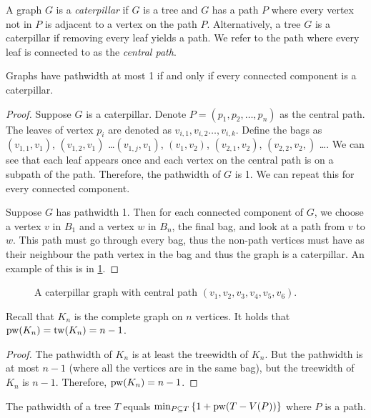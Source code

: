 A graph \(G\) is a \textit{caterpillar} if \(G\) is a tree and $G$ has a path \(P\) where every vertex not in $P$ is adjacent to a vertex on the path \(P\). Alternatively, a tree \(G\) is a caterpillar if removing every leaf yields a path. We refer to the path where every leaf is connected to as the \textit{central path}.
\begin{theorem}
	Graphs have pathwidth at most 1 if and only if every connected component is a caterpillar.
\end{theorem}
\begin{proof}
	Suppose \(G\) is a caterpillar.
	Denote \(P =\left( p_1, p_2, \dots, p_n\right)\) as the central path. The leaves of vertex \(p_i\) are denoted as \(v_{i, 1}, v_{i, 2} \dots, v_{i, k}\). Define the bags as \((v_{1, 1}, v_1)\), \((v_{1, 2}, v_1)\) \dots \((v_{1, j}, v_1)\),  \((v_1, v_2)\), \((v_{2, 1}, v_2)\), \((v_{2,2}, v_2,)\) \dots. We can see that each leaf appears once and each vertex on the central path is on a subpath of the path. Therefore, the pathwidth of \(G\) is 1. We can repeat this for every connected component.
	\par
	Suppose \(G\) has pathwidth 1. Then for each connected component of \(G\), we choose a vertex \(v\) in \(B_1\) and a vertex \(w\) in \(B_n\), the final bag, and look at a path from \(v\) to \(w\). This path must go through every bag, thus the non-path vertices must have as their neighbour the path vertex in the bag and thus the graph is a caterpillar. An example of this is in \cref{fig:caterpillar}.
\end{proof}
\begin{figure}[ht]
	\centering
	
	\caption{A caterpillar graph with central path \((v_1, v_2, v_3, v_4, v_5, v_6)\).}\label{fig:caterpillar}
\end{figure}

\begin{example}
	Recall that $K_n$ is the complete graph on $n$ vertices. It holds that \(\operatorname{pw}(K_n) = \operatorname{tw}(K_n) = n - 1\).
\end{example}
\begin{proof}
	The pathwidth of \(K_n\) is at least the treewidth of \(K_n\). But the pathwidth is at most \(n- 1\) (where all the vertices are in the same bag), but the treewidth of \(K_n\) is \(n - 1\). Therefore, \(\operatorname{pw}(K_n) = n - 1\).
\end{proof}

\begin{theorem}
	The pathwidth of a tree \(T\) equals \(\min_{P \subseteq T} \left\lbrace 1 + \operatorname{pw}(T - V(P))\right\rbrace \) where \(P\) is a path.
\end{theorem}

